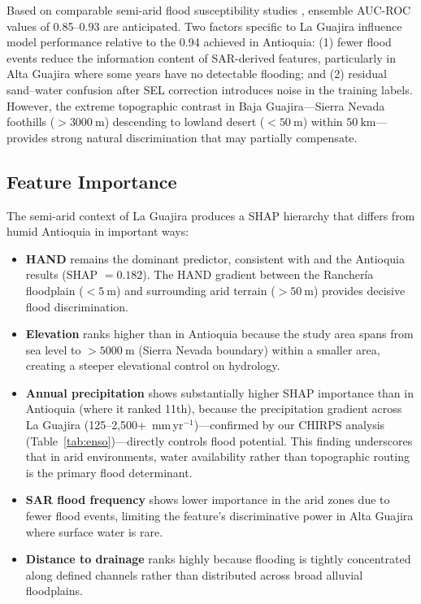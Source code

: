 \documentclass{article}
\begin{document}
Based on comparable semi-arid flood susceptibility studies \citep{Bammou2024, Ren2024, MoroccoSARML2024}, ensemble AUC-ROC values of 0.85--0.93 are anticipated. Two factors specific to La Guajira influence model performance relative to the 0.94 achieved in Antioquia: (1) fewer flood events reduce the information content of SAR-derived features, particularly in Alta Guajira where some years have no detectable flooding; and (2) residual sand--water confusion after SEL correction introduces noise in the training labels. However, the extreme topographic contrast in Baja Guajira---Sierra Nevada foothills ($>\SI{3000}{\metre}$) descending to lowland desert ($<\SI{50}{\metre}$) within $\SI{50}{\kilo\metre}$---provides strong natural discrimination that may partially compensate.

\subsection{Feature Importance}

The semi-arid context of La Guajira produces a SHAP hierarchy that differs from humid Antioquia in important ways:

\begin{itemize}
    \item \textbf{HAND} remains the dominant predictor, consistent with \citet{Bammou2024} and the Antioquia results (SHAP $= 0.182$). The HAND gradient between the Rancher\'ia floodplain ($<\SI{5}{\metre}$) and surrounding arid terrain ($>\SI{50}{\metre}$) provides decisive flood discrimination.
    \item \textbf{Elevation} ranks higher than in Antioquia because the study area spans from sea level to $>\SI{5000}{\metre}$ (Sierra Nevada boundary) within a smaller area, creating a steeper elevational control on hydrology.
    \item \textbf{Annual precipitation} shows substantially higher SHAP importance than in Antioquia (where it ranked 11th), because the precipitation gradient across La Guajira (125--2,500+~mm\,yr$^{-1}$)---confirmed by our CHIRPS analysis (Table~\ref{tab:enso})---directly controls flood potential. This finding underscores that in arid environments, water availability rather than topographic routing is the primary flood determinant.
    \item \textbf{SAR flood frequency} shows lower importance in the arid zones due to fewer flood events, limiting the feature's discriminative power in Alta Guajira where surface water is rare.
    \item \textbf{Distance to drainage} ranks highly because flooding is tightly concentrated along defined channels rather than distributed across broad alluvial floodplains.
\end{itemize}
\end{document}
